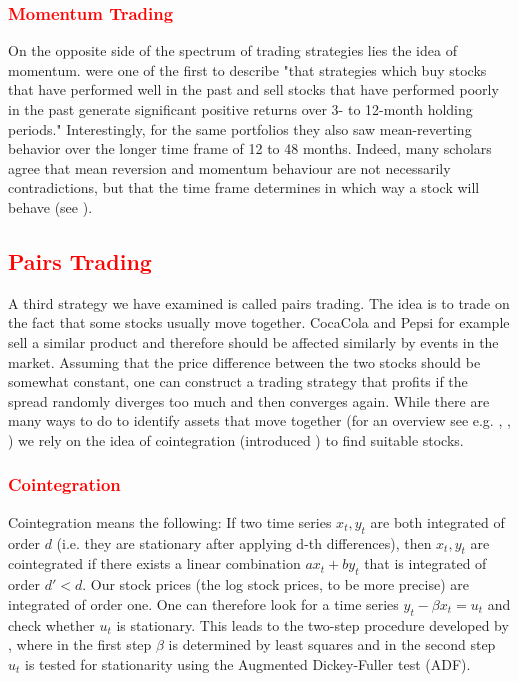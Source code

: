 \subsubsection{\textcolor{red}{Momentum Trading}}
On the opposite side of the spectrum of trading strategies lies the idea of momentum. \citep{jegadeesh_returns_1993} were one of the first to describe "that strategies which buy stocks that have performed well in the past and sell stocks that have performed poorly in the past generate significant positive returns over 3- to 12-month holding periods."   Interestingly, for the same portfolios they also saw mean-reverting behavior over the longer time frame of 12 to 48 months. Indeed, many scholars agree that mean reversion and momentum behaviour are not necessarily contradictions, but that the time frame determines in which way a stock will behave (see \citep{balvers_momentum_2006}). 


\subsection{\textcolor{red}{Pairs Trading}}
A third strategy we have examined is called pairs trading. The idea is to trade on the fact that some stocks usually move together. CocaCola and Pepsi for example sell a similar product and therefore should be affected similarly by events in the market. Assuming that the price difference between the two stocks should be somewhat constant, one can construct a trading strategy that profits if the spread randomly diverges too much and then converges again. While there are many ways to do to identify assets that move together (for an overview see e.g. \cite{gatev_pairs_1999}, \cite{ganapathy_vidyamurthy_pairs_2004}, \cite{do_new_2006}) we rely on the idea of cointegration (introduced \cite{engle_co-integration_1987}) to find suitable stocks. 

\subsubsection{\textcolor{red}{Cointegration}}
Cointegration means the following: If two time series $x_t, y_t$ are both integrated of order $d$ (i.e. they are stationary after applying d-th differences), then $x_t, y_t$ are cointegrated if there exists a linear combination $a x_t + b y_t$ that is integrated of order $d' < d$. Our stock prices (the log stock prices, to be more precise) are integrated of order one. One can therefore look for a time series  $y_t - \beta x_t = u_t$ and check whether $u_t$ is stationary. This leads to the two-step procedure developed by \cite{engle_co-integration_1987}, where in the first step $\beta$ is determined by least squares and in the second step $u_t$ is tested for stationarity using the Augmented Dickey-Fuller test (ADF). 

